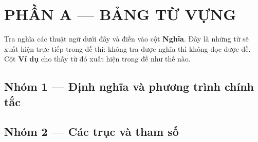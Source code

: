 \documentclass[11pt, a4paper]{article}
\begin{document}

\section{PHẦN A — BẢNG TỪ VỰNG}

Tra nghĩa các thuật ngữ dưới đây và điền vào cột \textbf{Nghĩa}. Đây là những từ sẽ xuất hiện trực tiếp trong đề thi: không tra được nghĩa thì không đọc được đề. Cột \textbf{Ví dụ} cho thấy từ đó xuất hiện trong đề như thế nào.

\subsection{Nhóm 1 — Định nghĩa và phương trình chính tắc}


\subsection{Nhóm 2 — Các trục và tham số}
\end{document}
